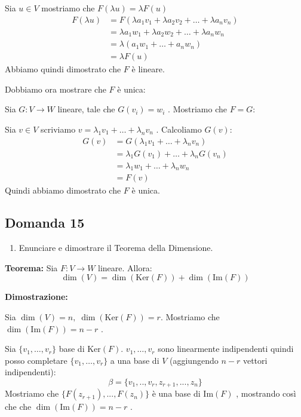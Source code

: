 \documentclass[
  a4paper,
]{article}
\providecommand{\tightlist}{%
  \setlength{\itemsep}{0pt}\setlength{\parskip}{0pt}}
\providecommand{\tightlist}{}
\begin{document}
Sia \(u\in V\) mostriamo che \(F(\lambda u) = \lambda F(u)\) \[
\begin{aligned}
F(\lambda u) &= F(\lambda a_1 v_1 + \lambda a_2 v_2 + \dots + \lambda a_n v_n ) \\
&= \lambda a_1 w_1 + \lambda a_2 w_2 + \dots + \lambda a_n w_n \\
&= \lambda (a_1 w_1 + \dots + a_n w_n) \\
&= \lambda F(u)
\end{aligned}
\] Abbiamo quindi dimostrato che \(F\) è lineare.

Dobbiamo ora mostrare che \(F\) è unica:

Sia \(G: V \to W\) lineare, tale che \(G(v_i) = w_i\) . Mostriamo che
\(F = G\):

Sia \(v \in V\) scriviamo \(v = \lambda_1 v_1 + \dots + \lambda_n v_n\)
. Calcoliamo \(G(v)\): \[
\begin{aligned}
G(v) &= G(\lambda_1 v_1 + \dots + \lambda_n v_n) \\
&= \lambda_1 G(v_1) + \dots + \lambda_n G(v_n)\\
&= \lambda_1 w_1 + \dots + \lambda_n w_n \\
&= F(v)
\end{aligned}
\] Quindi abbiamo dimostrato che \(F\) è unica.

\hypertarget{domanda-15}{%
\subsection{Domanda 15}\label{domanda-15}}

\begin{observationbox}[Domanda]
\begin{enumerate}
\def\labelenumi{\arabic{enumi}.}
\setcounter{enumi}{14}
\tightlist
\item
  Enunciare e dimostrare il Teorema della Dimensione.
\end{enumerate}
\end{observationbox}

\textbf{Teorema:} Sia \(F: V \to W\) lineare. Allora:\\
\[
\dim(V) = \dim(\text{Ker}(F)) + \dim(\text{Im}(F))
\]

\textbf{Dimostrazione:}

Sia \(\dim(V) = n, \; \dim(\text{Ker}(F)) = r\). Mostriamo che
\(\dim(\text{Im}(F)) = n - r\) .

Sia \(\{v_1, \dots, v_r \}\) base di \(\text{Ker}(F)\).
\(v_1, \dots, v_r\) sono linearmente indipendenti quindi posso
completare \(\{v_1, \dots, v_r \}\) a una base di \(V\) (aggiungendo
\(n-r\) vettori indipendenti): \[
\beta = \{v_1, .., v_r, z_{r+1},..., z_{n}\}
\] Mostriamo che \(\{F(z_{r+1}), ..., F(z_n)\}\) è una base di
\(\text{Im}(F)\) , mostrando così che che \(\dim(\text{Im}(F)) = n - r\)
.
\end{document}
